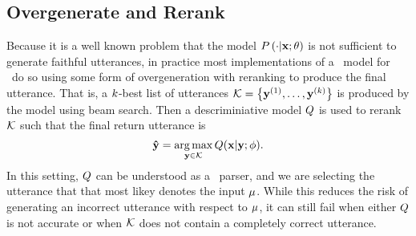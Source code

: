 \subsection{Overgenerate and Rerank}

Because it is a well known problem that the model $P\left(\cdot|\mathbf{x};\theta\right)$ is not sufficient to generate faithful utterances, in practice
most implementations of a \sequencetosequence~model for \surfacerealization~do
so using some form of overgeneration with reranking to produce the final
utterance. That is, a $k$-best list of utterances $\mathcal{K} = \left\{\mathbf{y}^{(1)},\ldots,
\mathbf{y}^{(k)}\right\}$ is produced by the model using beam search. Then 
a descriminiative model $Q$ is used to rerank $\mathcal{K}$ such
that the final return utterance is \[
\boldsymbol{\hat{\mathbf{y}}} = \operatorname*{arg\,max}_{\mathbf{y} \in \mathcal{K}} Q(\mathbf{x}|\mathbf{y};\phi). \]
In this setting, $Q$ can be understood as a 
\meaningrepresentation~parser, and we are selecting the utterance that 
that most likey denotes the input $\mu$. While this reduces the risk of
generating an incorrect utterance with respect to $\mu$, it can still fail
when either $Q$ is not accurate or when $\mathcal{K}$ does not contain
a completely correct utterance.

